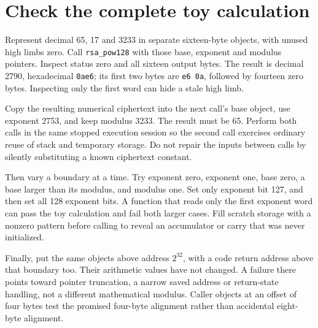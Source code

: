 \section{Check the complete toy calculation}
Represent decimal 65, 17 and 3233 in separate sixteen-byte objects, with unused high
limbs zero. Call \texttt{rsa\_pow128} with those base, exponent and modulus pointers.
Inspect status zero and all sixteen output bytes. The result is decimal 2790,
hexadecimal \texttt{0ae6}; its first two bytes are \texttt{e6 0a}, followed by fourteen
zero bytes. Inspecting only the first word can hide a stale high limb.

Copy the resulting numerical ciphertext into the next call's base object, use exponent
2753, and keep modulus 3233. The result must be 65. Perform both calls in the same
stopped execution session so the second call exercises ordinary reuse of stack and
temporary storage. Do not repair the inputs between calls by silently substituting
a known ciphertext constant.

Then vary a boundary at a time. Try exponent zero, exponent one, base zero, a base
larger than its modulus, and modulus one. Set only exponent bit 127, and then set all
128 exponent bits. A function that reads only the first exponent word can pass the
toy calculation and fail both larger cases. Fill scratch storage with a nonzero pattern
before calling to reveal an accumulator or carry that was never initialized.

Finally, put the same objects above address \(2^{32}\), with a code return address
above that boundary too. Their arithmetic values have not changed. A failure there
points toward pointer truncation, a narrow saved address or return-state handling,
not a different mathematical modulus. Caller objects at an offset of four bytes test
the promised four-byte alignment rather than accidental eight-byte alignment.
